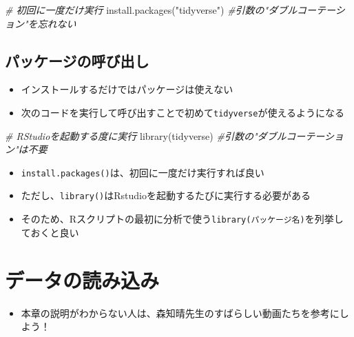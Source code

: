 \documentclass[
]{book}
\newenvironment{Shaded}{\begin{snugshade}}{\end{snugshade}}
\newcommand{\CommentTok}[1]{\textcolor[rgb]{0.56,0.35,0.01}{\textit{#1}}}
\newcommand{\FunctionTok}[1]{\textcolor[rgb]{0.00,0.00,0.00}{#1}}
\newcommand{\NormalTok}[1]{#1}
\newcommand{\StringTok}[1]{\textcolor[rgb]{0.31,0.60,0.02}{#1}}
\providecommand{\tightlist}{%
  \setlength{\itemsep}{0pt}\setlength{\parskip}{0pt}}
\begin{document}
\begin{Shaded}
\begin{Highlighting}[]
\CommentTok{\# 初回に一度だけ実行}
\FunctionTok{install.packages}\NormalTok{(}\StringTok{"tidyverse"}\NormalTok{) }\CommentTok{\#引数の"ダブルコーテーション"を忘れない}
\end{Highlighting}
\end{Shaded}

\hypertarget{ux30d1ux30c3ux30b1ux30fcux30b8ux306eux547cux3073ux51faux3057}{%
\section{パッケージの呼び出し}\label{ux30d1ux30c3ux30b1ux30fcux30b8ux306eux547cux3073ux51faux3057}}

\begin{itemize}
\tightlist
\item
  インストールするだけではパッケージは使えない
\item
  次のコードを実行して呼び出すことで初めて\texttt{tidyverse}が使えるようになる
\end{itemize}

\begin{Shaded}
\begin{Highlighting}[]
\CommentTok{\# RStudioを起動する度に実行}
\FunctionTok{library}\NormalTok{(tidyverse) }\CommentTok{\#引数の"ダブルコーテーション"は不要}
\end{Highlighting}
\end{Shaded}

\begin{itemize}
\tightlist
\item
  \texttt{install.packages()}は、初回に一度だけ実行すれば良い
\item
  ただし、\texttt{library()}はRstudioを起動するたびに実行する必要がある
\item
  そのため、Rスクリプトの最初に分析で使う\texttt{library(パッケージ名)}を列挙しておくと良い
\end{itemize}

\hypertarget{ux30c7ux30fcux30bfux306eux8aadux307fux8fbcux307f}{%
\chapter{データの読み込み}\label{ux30c7ux30fcux30bfux306eux8aadux307fux8fbcux307f}}

\begin{itemize}
\tightlist
\item
  本章の説明がわからない人は、森知晴先生のすばらしい動画たちを参考にしよう！
\end{itemize}
\end{document}
